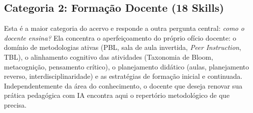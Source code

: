 \subsection{Categoria 2: Forma{\c c}{\~a}o Docente (18 Skills)}

Esta {\'e} a maior categoria do acervo e responde a outra pergunta central: \emph{como o docente ensina?} Ela concentra o aperfei{\c c}oamento do pr{\'o}prio of{\'i}cio docente: o dom{\'i}nio de metodologias ativas (PBL, sala de aula invertida, \emph{Peer Instruction}, TBL), o alinhamento cognitivo das atividades (Taxonomia de Bloom, metacogni{\c c}{\~a}o, pensamento cr{\'i}tico), o planejamento did{\'a}tico (aulas, planejamento reverso, interdisciplinaridade) e as estrat{\'e}gias de forma{\c c}{\~a}o inicial e continuada. Independentemente da {\'a}rea do conhecimento, o docente que deseja renovar sua pr{\'a}tica pedag{\'o}gica com IA encontra aqui o repert{\'o}rio metodol{\'o}gico de que precisa.

